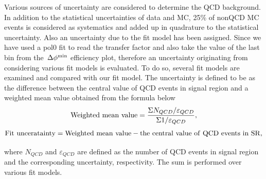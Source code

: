 Various sources of uncertainty are considered to determine the QCD background. 
In addition to the statistical uncertainties of data and MC, 25\% of 
nonQCD MC events is considered as systematics and added up in quadrature to the statistical uncertainty.
Also an uncertainty due to the fit model has been assigned. Since we have used a pol0 fit 
to read the transfer factor and also take the value of the last bin from the $\,{\Delta\phi^{\rm min}}$ efficiency plot,
therefore an uncertainty originating from considering various fit models is evaluated. To do so, several 
fit models are examined and compared with our fit model. The uncertainty is defined to be as the 
difference between the central value of QCD events in signal region and a weighted mean value obtained from the formula below 
\begin{equation}
{\rm Weighted~mean~value} =\frac{\Sigma N_{QCD}/\varepsilon_{QCD}}{\Sigma 1/\varepsilon_{QCD}},
\end{equation}
\begin{equation}
{\rm Fit~unceratainty} ={\rm Weighted~mean~value}-{\rm the~central~value~of~QCD~events~in~SR},
\end{equation}

where $N_{QCD}$ and $\varepsilon_{QCD}$ are defined as the number of QCD events in signal region and 
the corresponding uncertainty, respectivity. The sum is performed over various fit models.\\ 

